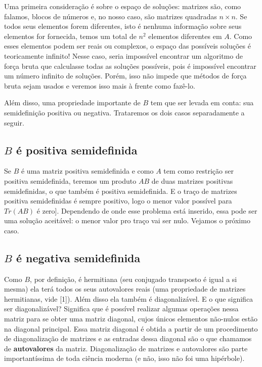 \documentclass[11pt]{article}
\begin{document}
Uma primeira consideração é sobre o espaço de soluções: matrizes são,
como falamos, blocos de números e, no nosso caso, são matrizes quadradas
\(n\times n\). Se todos seus elementos forem diferentes, isto é nenhuma
informação sobre seus elementos for fornecida, temos um total de \(n^2\)
elementos diferentes em \(A\). Como esses elementos podem ser reais ou
complexos, o espaço das possíveis soluções é teoricamente infinito!
Nesse caso, seria impossível encontrar um algoritmo de força bruta que
calculasse todas as soluções possíveis, pois é impossível encontrar um
número infinito de soluções. Porém, isso não impede que métodos de força
bruta sejam usados e veremos isso mais à frente como fazê-lo.

Além disso, uma propriedade importante de \(B\) tem que ser levada em
conta: sua semidefinição positiva ou negativa. Trataremos os dois casos
separadamente a seguir.

    \hypertarget{b-uxe9-positiva-semidefinida}{%
\subsection{ \(B\) é positiva semidefinida}\label{b-uxe9-positiva-semidefinida}}

    Se \(B\) é uma matriz positiva semidefinida e como \(A\) tem como
restrição ser positiva semidefinida, teremos um produto \(AB\) de duas
matrizes positivas semidefinidas, o que também é positiva semidefinida.
E o traço de matrizes positiva semidefinidas é sempre positivo, logo o
menor valor possível para \(Tr(AB)\) é zero{]}. Dependendo de onde esse
problema está inserido, essa pode ser uma solução aceitável: o menor
valor pro traço vai ser nulo. Vejamos o próximo caso.

    \hypertarget{b-uxe9-negativa-semidefinida}{%
\subsection{\(B\) é negativa
semidefinida}\label{b-uxe9-negativa-semidefinida}}

    Como \(B\), por definição, é hermitiana (seu conjugado transposto é
igual a si mesma) ela terá todos os seus autovalores reais (uma
propriedade de matrizes hermitianas, vide {[}1{]}). Além disso ela
também é diagonalizável. E o que significa ser diagonalizável? Significa
que é possível realizar algumas operações nessa matriz para se obter uma
matriz diagonal, cujos únicos elementos não-nulos estão na diagonal
principal. Essa matriz diagonal é obtida a partir de um procedimento de
diagonalização de matrizes e as entradas dessa diagonal são o que
chamamos de \textbf{autovalores} da matriz. Diagonalização de matrizes e
autovalores são parte importantíssima de toda ciência moderna (e não,
isso não foi uma hipérbole).
\end{document}
